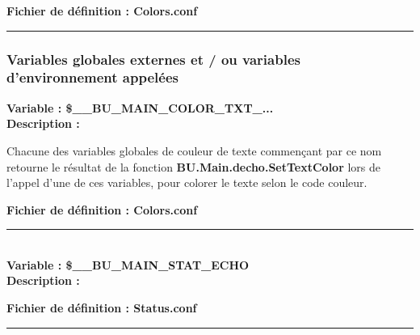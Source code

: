 \documentclass[a4paper,10pt]{article}
\begin{document}
\textbf{Fichier de définition : \color{path}Colors.conf}\\[1\baselineskip]



\color{sec3}\par\noindent\rule{\textwidth}{0.4pt}\color{text}

\color{sec3}
\subsubsection{Variables globales externes et / ou variables d'environnement appelées}\color{text}

\textbf{Variable : \color{vars}\$\_\_BU\_MAIN\_COLOR\_TXT\_...}\\[1\baselineskip]

\textbf{Description :}

\begin{justify}
    Chacune des variables globales de couleur de texte commençant par ce nom retourne le résultat de la fonction \textbf{\color{func}BU.Main.decho.SetTextColor} lors de l'appel d'une de ces variables, pour colorer le texte selon le code couleur.
\end{justify}

\textbf{Fichier de définition : \color{path}Colors.conf}\\[1\baselineskip]




\color{vars}\par\noindent\rule{\textwidth}{0.4pt}\color{text}\\[1\baselineskip]

\textbf{Variable : \color{vars}\$\_\_BU\_MAIN\_STAT\_ECHO}\\[1\baselineskip]

\textbf{Description :}

\textbf{Fichier de définition : \color{path}Status.conf}\\[1\baselineskip]




\color{vars}\par\noindent\rule{\textwidth}{0.4pt}\color{text}\\[1\baselineskip]
\end{document}
